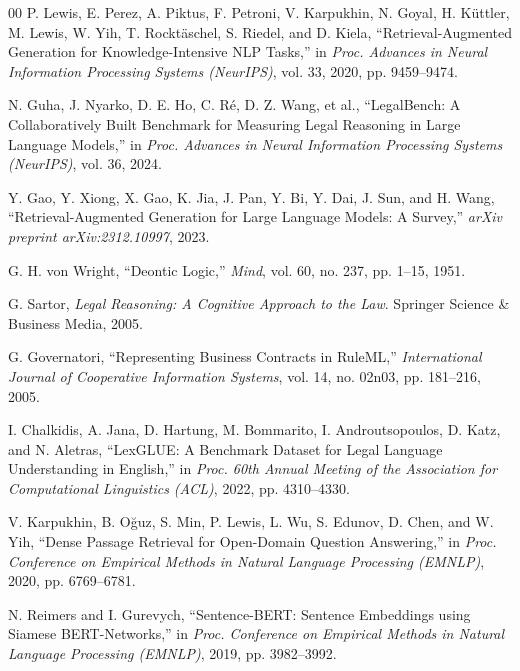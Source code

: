 \documentclass[conference]{IEEEtran}
\begin{document}
\begingroup
\footnotesize
\setlength{\parskip}{0pt}
\setlength{\itemsep}{1pt plus 0.5pt minus 0.5pt}
\begin{thebibliography}{00}
 P. Lewis, E. Perez, A. Piktus, F. Petroni, V. Karpukhin, N. Goyal, H. K{\"u}ttler, M. Lewis, W. Yih, T. Rockt{\"a}schel, S. Riedel, and D. Kiela, ``Retrieval-Augmented Generation for Knowledge-Intensive NLP Tasks,'' in \textit{Proc. Advances in Neural Information Processing Systems (NeurIPS)}, vol. 33, 2020, pp. 9459--9474.

 N. Guha, J. Nyarko, D. E. Ho, C. R{\'e}, D. Z. Wang, et al., ``LegalBench: A Collaboratively Built Benchmark for Measuring Legal Reasoning in Large Language Models,'' in \textit{Proc. Advances in Neural Information Processing Systems (NeurIPS)}, vol. 36, 2024.

 Y. Gao, Y. Xiong, X. Gao, K. Jia, J. Pan, Y. Bi, Y. Dai, J. Sun, and H. Wang, ``Retrieval-Augmented Generation for Large Language Models: A Survey,'' \textit{arXiv preprint arXiv:2312.10997}, 2023.

 G. H. von Wright, ``Deontic Logic,'' \textit{Mind}, vol. 60, no. 237, pp. 1--15, 1951.

 G. Sartor, \textit{Legal Reasoning: A Cognitive Approach to the Law}. Springer Science \& Business Media, 2005.

 G. Governatori, ``Representing Business Contracts in RuleML,'' \textit{International Journal of Cooperative Information Systems}, vol. 14, no. 02n03, pp. 181--216, 2005.

 I. Chalkidis, A. Jana, D. Hartung, M. Bommarito, I. Androutsopoulos, D. Katz, and N. Aletras, ``LexGLUE: A Benchmark Dataset for Legal Language Understanding in English,'' in \textit{Proc. 60th Annual Meeting of the Association for Computational Linguistics (ACL)}, 2022, pp. 4310--4330.

 V. Karpukhin, B. O{\u{g}}uz, S. Min, P. Lewis, L. Wu, S. Edunov, D. Chen, and W. Yih, ``Dense Passage Retrieval for Open-Domain Question Answering,'' in \textit{Proc. Conference on Empirical Methods in Natural Language Processing (EMNLP)}, 2020, pp. 6769--6781.

 N. Reimers and I. Gurevych, ``Sentence-BERT: Sentence Embeddings using Siamese BERT-Networks,'' in \textit{Proc. Conference on Empirical Methods in Natural Language Processing (EMNLP)}, 2019, pp. 3982--3992.


\end{thebibliography}
\end{document}
